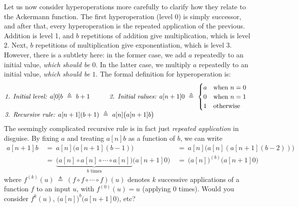 Let us now consider hyperoperations more carefully
to clarify how they relate to the Ackermann function.
The first hyperoperation (level 0) is simply successor, and after that,
every hyperoperation is the repeated application of the previous.
Addition is level 1, and $b$ repetitions of addition
give multiplication, which is level 2. Next, $b$ repetitions of
multiplication give exponentiation, which is level 3. However,
there is a subtlety here: in the former case, we add $a$
repeatedly to an initial value, \emph{which should be $0$}.
In the latter case, we multiply $a$ repeatedly to an initial value,
\emph{which should be $1$}. The formal definition for hyperoperation is:
\begin{equation}
\label{eq:hyper}
\begin{array}{@{}l@{\qquad\quad}l}
\textit{1. Initial level: } a[0]b ~ \triangleq ~ b + 1 &
\textit{2. Initial values: } a[n+1]0 ~ \triangleq ~
\begin{cases}
a & \text{when } n = 0 \\
0 & \text{when } n = 1 \\
1 & \text{otherwise}
\end{cases}
\\
\multicolumn{2}{@{}l}{\textit{3. Recursive rule: } a[n+1](b+1) ~ \triangleq ~ a[n]\big(a[n+1]b\big)}
\end{array}
\end{equation}
The seemingly complicated recursive rule is in fact just \emph{repeated application} in disguise. By fixing $a$ and treating $a[n]b$ as a function of $b$, we can write
\begin{equation*}
\begin{array}{lll}
a[n+1]b & ~ = ~ a[n]\big(a[n+1](b-1)\big) & ~ = ~ a[n]\big(a[n](a[n+1](b-2))\big) \\
 & ~ = ~ \underbrace{\big( a[n]\circ a[n]\circ \cdots \circ a[n] \big)}_{b \text{ times}} \big(a[n+1]0\big) & ~ = ~ \big(a[n]\big)^{(b)}\big(a[n+1]0\big)
\end{array}
\end{equation*}
where $f^{(k)}(u) ~ \triangleq ~ (f\circ f\circ \cdots \circ f)(u)$ denotes $k$ successive applications of a function $f$ to an input $u$, with $f^{(0)}(u) = u $ (applying $0$ times). {\color{blue} Would you consider $f^k(u)$, $\big(a[n]\big)^b\big(a[n+1]0\big)$, etc?}

